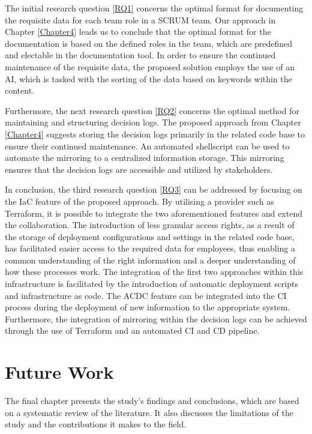 The initial research question \ref{RQ1} concerns the optimal format for documenting the requisite data for each team role in a \ac{SCRUM} team. Our approach in Chapter \ref{Chapter4} leads us to conclude that the optimal format for the documentation is based on the defined roles in the team, which are predefined and electable in the documentation tool. In order to ensure the continued maintenance of the requisite data, the proposed solution employs the use of an \ac{AI}, which is tasked with the sorting of the data based on keywords within the content.

Furthermore, the next research question \ref{RQ2} concerns the optimal method for maintaining and structuring decision logs. The proposed approach from Chapter \ref{Chapter4} suggests storing the decision logs primarily in the related code base to ensure their continued maintenance. An automated shellscript can be used to automate the mirroring to a centralized information storage. This mirroring ensures that the decision logs are accessible and utilized by stakeholders.

In conclusion, the third research question \ref{RQ3} can be addressed by focusing on the \ac{IaC} feature of the proposed approach. By utilising a provider such as Terraform, it is possible to integrate the two aforementioned features and extend the collaboration. The introduction of less granular access rights, as a result of the storage of deployment configurations and settings in the related code base, has facilitated easier access to the required data for employees, thus enabling a common understanding of the right information and a deeper understanding of how these processes work. The integration of the first two approaches within this infrastructure is facilitated by the introduction of automatic deployment scripts and infrastructure as code. The \ac{ACDC} feature can be integrated into the \ac{CI} process during the deployment of new information to the appropriate system. Furthermore, the integration of mirroring within the decision logs can be achieved through the use of Terraform and an automated \ac{CI} and \ac{CD} pipeline.

\section{Future Work}
The final chapter presents the study's findings and conclusions, which are based on a systematic review of the literature. It also discusses the limitations of the study and the contributions it makes to the field.

